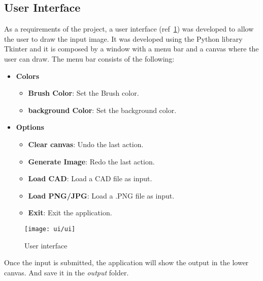 \subsection{User Interface}\label{subsec:user-interface}
As a requirements of the project, a user interface (ref~\ref{fig:ui}) was developed to allow the user to draw the input image.
It was developed using the Python library Tkinter and it is composed by a window with a menu bar and a canvas where the user can draw.
The menu bar consists of the following:
\begin{itemize}
    \item \textbf{Colors}
    \begin{itemize}
        \item \textbf{Brush Color}: Set the Brush color.
        \item \textbf{background Color}: Set the background color.
    \end{itemize}
    \item \textbf{Options}
    \begin{itemize}
        \item \textbf{Clear canvas}: Undo the last action.
        \item \textbf{Generate Image}: Redo the last action.
        \item \textbf{Load CAD}: Load a CAD file as input.
        \item \textbf{Load PNG/JPG}: Load a .PNG file as input.
        \item \textbf{Exit}: Exit the application.
    \end{itemize}
\end{itemize}
\begin{figure}[H]
    \centering
    \texttt{[image: ui/ui]}
    \caption{User interface}\label{fig:ui}
\end{figure}
Once the input is submitted, the application will show the output in the lower canvas.
And save it in the \textit{output} folder.
